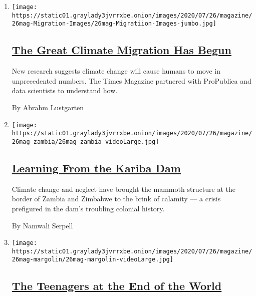\begin{enumerate}
\def\labelenumi{\arabic{enumi}.}
\item
  \texttt{[image: https://static01.graylady3jvrrxbe.onion/images/2020/07/26/magazine/26mag-Migration-Images/26mag-Migratiion-Images-jumbo.jpg]}

  \hypertarget{the-great-climate-migration-has-begun}{%
  \subsection{\texorpdfstring{\href{/interactive/2020/07/23/magazine/climate-migration.html}{The
  Great Climate Migration Has
  Begun}}{The Great Climate Migration Has Begun}}\label{the-great-climate-migration-has-begun}}

  New research suggests climate change will cause humans to move in
  unprecedented numbers. The Times Magazine partnered with ProPublica
  and data scientists to understand how.

  By Abrahm Lustgarten
\item
  \texttt{[image: https://static01.graylady3jvrrxbe.onion/images/2020/07/26/magazine/26mag-zambia/26mag-zambia-videoLarge.jpg]}

  \hypertarget{learning-from-the-kariba-dam}{%
  \subsection{\texorpdfstring{\href{/interactive/2020/07/22/magazine/zambia-kariba-dam.html}{Learning
  From the Kariba
  Dam}}{Learning From the Kariba Dam}}\label{learning-from-the-kariba-dam}}

  Climate change and neglect have brought the mammoth structure at the
  border of Zambia and Zimbabwe to the brink of calamity --- a crisis
  prefigured in the dam's troubling colonial history.

  By Namwali Serpell
\item
  \texttt{[image: https://static01.graylady3jvrrxbe.onion/images/2020/07/26/magazine/26mag-margolin/26mag-margolin-videoLarge.jpg]}

  \hypertarget{the-teenagers-at-the-end-of-the-world}{%
  \subsection{\texorpdfstring{\href{/interactive/2020/07/21/magazine/teenage-activist-climate-change.html}{The
  Teenagers at the End of the
  World}}{The Teenagers at the End of the World}}\label{the-teenagers-at-the-end-of-the-world}}


\end{enumerate}

